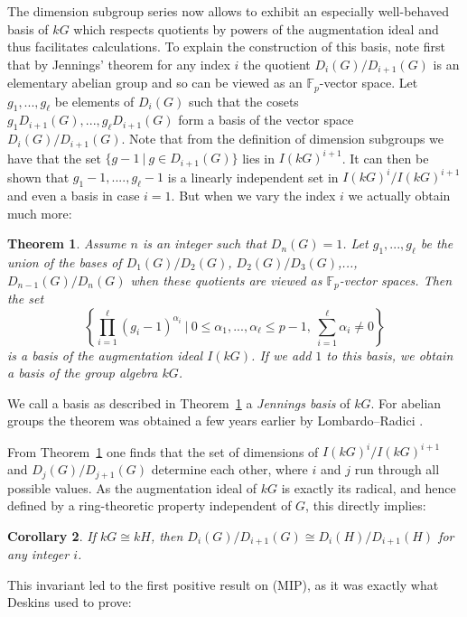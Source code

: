 \documentclass[11pt, a4paper]{amsart}
\newtheorem{theorem}{Theorem}[section]
\newtheorem{corollary}[theorem]{Corollary}
\theoremstyle{definition}
\begin{document}
The dimension subgroup series now allows to exhibit an especially well-behaved basis of $kG$ which respects quotients by powers of the augmentation ideal and thus facilitates calculations. To explain the construction of this basis, note first that by Jennings' theorem for any index $i$ the quotient $D_i(G)/D_{i+1}(G)$ is an elementary abelian group and so can be viewed as an $\mathbb{F}_p$-vector space. Let $g_1,...,g_\ell$ be elements of $D_i(G)$ such that the cosets $g_1D_{i+1}(G),...,g_\ell D_{i+1}(G)$ form a basis of the vector space $D_i(G)/D_{i+1}(G)$. Note that from the definition of dimension subgroups we have that the set $\{g-1 \ | \ g \in D_{i+1}(G) \}$ lies in $I(kG)^{i+1}$. It can then be shown that $g_1-1,....,g_\ell-1$ is a linearly independent set in $I(kG)^i/I(kG)^{i+1}$ and even a basis in case $i=1$. But when we vary the index $i$ we actually obtain much more:

\begin{theorem}\label{th:Jennings} \cite{Jennings41}
Assume $n$ is an integer such that $D_n(G) = 1$. Let $g_1,...,g_\ell$ be the union of the bases of $D_1(G)/D_2(G)$, $D_2(G)/D_3(G)$,...,$D_{n-1}(G)/D_n(G)$ when these quotients are viewed as $\mathbb{F}_p$-vector spaces. Then the set
\[\left\{\prod_{i=1}^\ell (g_i-1)^{\alpha_i} \ | \ 0 \leq \alpha_1,...,\alpha_\ell \leq p-1, \ \sum_{i=1}^\ell \alpha_i \neq 0 \right\} \]
is a basis of the augmentation ideal $I(kG)$. If we add $1$ to this basis, we obtain a basis of the group algebra $kG$.
\end{theorem}

We call a basis as described in Theorem~\ref{th:Jennings} a \emph{Jennings basis} of $kG$. For abelian groups the theorem was obtained a few years earlier by Lombardo--Radici \cite{LombardoRadici}.

From Theorem~\ref{th:Jennings} one finds that the set of dimensions of $I(kG)^i/I(kG)^{i+1}$ and $D_j(G)/D_{j+1}(G)$ determine each other, where $i$ and $j$ run through all possible values. As the augmentation ideal of $kG$ is exactly its radical, and hence defined by a ring-theoretic property independent of $G$, this directly implies:

\begin{corollary}\label{cor:DimQuots}
If $kG \cong kH$, then $D_i(G)/D_{i+1}(G) \cong D_i(H)/D_{i+1}(H)$ for any integer $i$.
\end{corollary}

This invariant led to the first positive result on (MIP), as it was exactly what Deskins used to prove:
\end{document}

